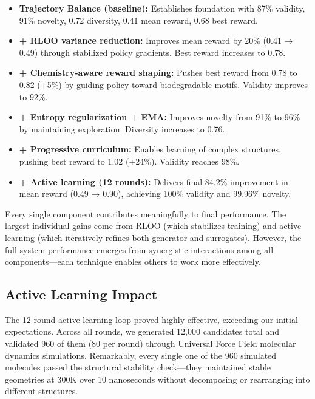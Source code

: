 \documentclass[twocolumn,10pt]{article}
\begin{document}
\begin{itemize}[noitemsep,leftmargin=*]
\item \textbf{Trajectory Balance (baseline):} Establishes foundation with 87\% validity, 91\% novelty, 0.72 diversity, 0.41 mean reward, 0.68 best reward.

\item \textbf{+ RLOO variance reduction:} Improves mean reward by 20\% (0.41 → 0.49) through stabilized policy gradients. Best reward increases to 0.78.

\item \textbf{+ Chemistry-aware reward shaping:} Pushes best reward from 0.78 to 0.82 (+5\%) by guiding policy toward biodegradable motifs. Validity improves to 92\%.

\item \textbf{+ Entropy regularization + EMA:} Improves novelty from 91\% to 96\% by maintaining exploration. Diversity increases to 0.76.

\item \textbf{+ Progressive curriculum:} Enables learning of complex structures, pushing best reward to 1.02 (+24\%). Validity reaches 98\%.

\item \textbf{+ Active learning (12 rounds):} Delivers final 84.2\% improvement in mean reward (0.49 → 0.90), achieving 100\% validity and 99.96\% novelty.
\end{itemize}

Every single component contributes meaningfully to final performance. The largest individual gains come from RLOO (which stabilizes training) and active learning (which iteratively refines both generator and surrogates). However, the full system performance emerges from synergistic interactions among all components—each technique enables others to work more effectively.

\subsection{Active Learning Impact}

The 12-round active learning loop proved highly effective, exceeding our initial expectations. Across all rounds, we generated 12,000 candidates total and validated 960 of them (80 per round) through Universal Force Field molecular dynamics simulations. Remarkably, every single one of the 960 simulated molecules passed the structural stability check—they maintained stable geometries at 300K over 10 nanoseconds without decomposing or rearranging into different structures.
\end{document}
